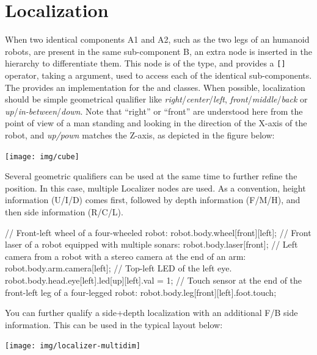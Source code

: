 \section{Localization}
When two identical components A1 and A2, such as the two legs of an humanoid
robots, are present in the same sub-component B, an extra node is inserted
in the hierarchy to differentiate them. This node is of the
 type, and provides a \lstinline{[]} operator, taking a
 argument, used to access each of the identical
sub-components.  The \usdk provides an implementation for the
 and  classes.  When possible,
localization should be simple geometrical qualifier like
\textit{right}/\textit{center}/\textit{left},
\textit{front}/\textit{middle}/\textit{back} or
\textit{up}/\textit{in-between}/\textit{down}.  Note that ``right'' or
``front'' are understood here from the point of view of a man standing and
looking in the direction of the X-axis of the robot, and \textit{up/pown}
matches the Z-axis, as depicted in the figure below:

\begin{center}
  \texttt{[image: img/cube]}
\end{center}

Several geometric qualifiers can be used at the same time to further
refine the position. In this case, multiple Localizer nodes are used.
As a convention, height information (U/I/D) comes first,
followed by depth information (F/M/H), and then side information (R/C/L).

\begin{urbiunchecked}
// Front-left wheel of a four-wheeled robot:
robot.body.wheel[front][left];
// Front laser of a robot equipped with multiple sonars:
robot.body.laser[front];
// Left camera from a robot with a stereo camera at the end of an arm:
robot.body.arm.camera[left];
// Top-left LED of the left eye.
robot.body.head.eye[left].led[up][left].val = 1;
// Touch sensor at the end of the front-left leg of a four-legged robot:
robot.body.leg[front][left].foot.touch;
\end{urbiunchecked}

You can further qualify a side+depth localization with an additional
F/B side information. This can be used in the typical layout below:

\begin{center}
  \texttt{[image: img/localizer-multidim]}
\end{center}

